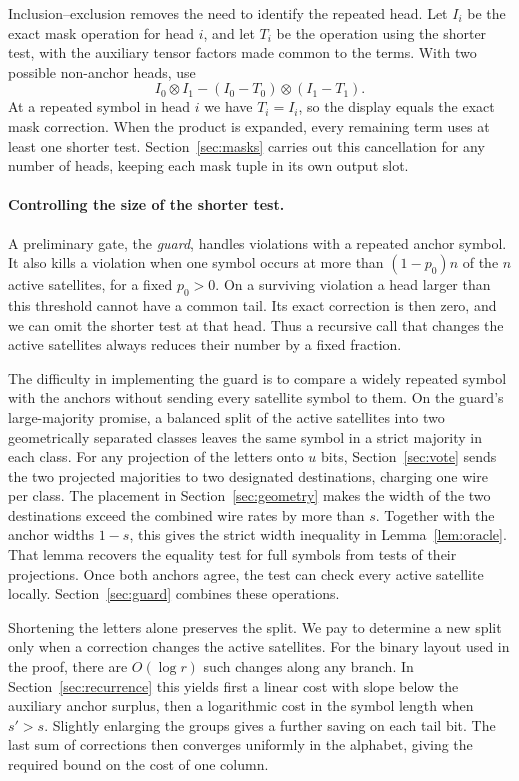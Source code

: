 Inclusion--exclusion removes the need to identify the repeated head. Let
\(I_i\) be the exact mask operation for head \(i\), and let \(T_i\) be
the operation using the shorter test, with the auxiliary tensor
factors made common to the terms. With two possible non-anchor heads,
use
\[
          I_0\otimes I_1-(I_0-T_0)\otimes(I_1-T_1).
\]
At a repeated symbol in head \(i\) we have \(T_i=I_i\), so the
display equals the exact mask correction. When the product is
expanded, every remaining term uses at least one shorter test.
Section~\ref{sec:masks} carries out this cancellation for any number
of heads, keeping each mask tuple in its own output slot.

\paragraph{Controlling the size of the shorter test.}
A preliminary gate, the \emph{guard}, handles violations with a
repeated anchor symbol. It also kills a violation when one symbol
occurs at more than \((1-p_0)n\) of the \(n\) active satellites, for
a fixed \(p_0>0\). On a surviving violation a head larger than this
threshold cannot have a common tail. Its exact correction is then
zero, and we can omit the shorter test at that head. Thus a recursive
call that changes the active satellites always reduces their number
by a fixed fraction.

The difficulty in implementing the guard is to compare a widely
repeated symbol with the anchors without sending every satellite
symbol to them. On the guard's large-majority promise, a balanced split of the active
satellites into two geometrically separated classes leaves the same
symbol in a strict majority in each class. For any projection of the letters onto \(u\)
bits, Section~\ref{sec:vote} sends the two projected majorities to
two designated destinations, charging one wire per class. The
placement in Section~\ref{sec:geometry} makes the width of the two
destinations exceed the combined wire rates by more than \(s\).
Together with the anchor widths \(1-s\), this gives the strict width
inequality in Lemma~\ref{lem:oracle}. That lemma recovers the equality
test for full symbols from tests of their projections. Once both
anchors agree, the test can check every active satellite locally.
Section~\ref{sec:guard} combines these operations.

Shortening the letters alone preserves the split. We pay to determine
a new split only when a correction changes the active satellites.
For the binary layout used in the proof, there are \(O(\log r)\) such
changes along any branch. In
Section~\ref{sec:recurrence} this yields first a linear cost with
slope below the auxiliary anchor surplus, then a logarithmic cost in
the symbol length when \(s'>s\). Slightly enlarging the groups gives
a further saving on each tail bit. The last sum of corrections then
converges uniformly in the alphabet, giving the required bound on
the cost of one column.
